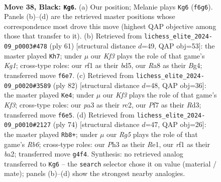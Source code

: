 \documentclass[11pt]{article}
\begin{document}
\clearpage

\begin{figure}[p]\centering
\begin{subfigure}{0.46\textwidth}\centering
\resizebox{\linewidth}{!}{%
\newchessgame
\chessboard[
  setfen={r7/pp3p2/5k2/3B3p/bP2P1r1/P6p/8/R4R1K b - - 3 38},
  showmover=false,
  pgfstyle=straightmove, color=movearrow, markmove={f6-g6}
]}
\caption{}
\end{subfigure}\hfill
\begin{subfigure}{0.46\textwidth}\centering
\resizebox{\linewidth}{!}{%
\newchessgame
\chessboard[
  setfen={6k1/p5p1/2R4p/3B4/P5b1/2P2RPr/1r6/6K1 b - - 9 31},
  showmover=false,
  pgfstyle=straightmove, color=movearrow, markmove={g8-h7}
]}
\caption{}
\end{subfigure}
\\[4pt]
\begin{subfigure}{0.46\textwidth}\centering
\resizebox{\linewidth}{!}{%
\newchessgame
\chessboard[
  setfen={5k2/b4p1R/p4B2/1p2PP2/3p4/3R1K1P/P1r2r2/8 w - - 3 42},
  showmover=false,
  pgfstyle=straightmove, color=movearrow, markmove={f3-e4}
]}
\caption{}
\end{subfigure}\hfill
\begin{subfigure}{0.46\textwidth}\centering
\resizebox{\linewidth}{!}{%
\newchessgame
\chessboard[
  setfen={6k1/5p2/1R4p1/1P6/3P3P/6P1/br1r1PB1/4R1K1 w - - 1 38},
  showmover=false,
  pgfstyle=straightmove, color=movearrow, markmove={b6-b8}
]}
\caption{}
\end{subfigure}
\caption{\textbf{Move 38, Black: \texttt{Kg6}.} (a) Our position; Melanie plays \texttt{Kg6} (\texttt{f6g6}). Panels (b)--(d) are the retrieved master positions whose correspondence most drove this move (highest QAP objective among those that transfer to it). (b) Retrieved from \texttt{lichess\_elite\_2024-09\_p0003\#478} (ply 61) [structural distance $d$=49, QAP obj=53]: the master played \texttt{Kh7}; under $\mu$ our \emph{Kf3} plays the role of that game's \emph{Kg1}; cross-type roles: our \emph{r}f1 as their \emph{b}d5, our \emph{R}a8 as their \emph{B}g4; transferred move \texttt{f6e7}. (c) Retrieved from \texttt{lichess\_elite\_2024-09\_p0020\#3589} (ply 82) [structural distance $d$=48, QAP obj=36]: the master played \texttt{Ke4}; under $\mu$ our \emph{Kf3} plays the role of that game's \emph{Kf3}; cross-type roles: our \emph{p}a3 as their \emph{r}c2, our \emph{P}f7 as their \emph{R}d3; transferred move \texttt{f6e5}. (d) Retrieved from \texttt{lichess\_elite\_2024-09\_p0010\#2127} (ply 74) [structural distance $d$=47, QAP obj=26]: the master played \texttt{Rb8+}; under $\mu$ our \emph{Rg5} plays the role of that game's \emph{Rb6}; cross-type roles: our \emph{P}h3 as their \emph{R}e1, our \emph{r}f1 as their \emph{b}a2; transferred move \texttt{g4f4}. Synthesis: no retrieved analog transferred to \texttt{Kg6} -- the \texttt{search} selector chose it on value (material / mate); panels (b)--(d) show the strongest nearby analogies.}
\label{fig:thought-m75}
\end{figure}
\end{document}
